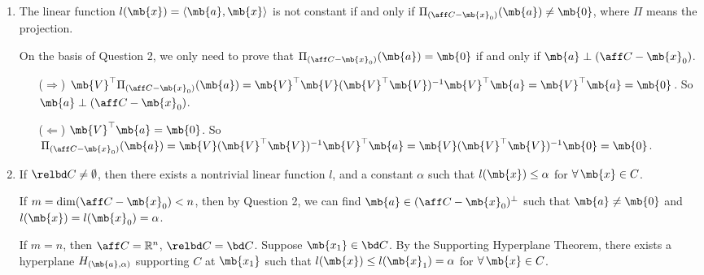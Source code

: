 \begin{exercise}
\begin{enumerate}
\begin{solution}
      \end{solution}
    \item
      The linear function $l(\mb{x})=\langle \mb{a},\mb{x}\rangle$ is not constant if and only if $\Pi_{(\aff C-\mb{x}_0)}(\mb{a})\neq \mb{0}$, where $\Pi$ means the projection.
      \begin{solution}
        On the basis of Question 2, we only need to prove that $\Pi_{(\aff C-\mb{x}_0)}(\mb{a}) = \mb{0}$ if and only if $\mb{a}\perp (\aff C-\mb{x}_0)$. 
        \begin{itemize}
          \item [($\Rightarrow$)]
            $\mb{V}^\top\Pi_{(\aff C-\mb{x}_0)}(\mb{a}) = \mb{V}^\top\mb{V}(\mb{V}^\top\mb{V})^{-1}\mb{V}^\top\mb{a} = \mb{V}^\top\mb{a} = \mb{0}$. So $\mb{a}\perp (\aff C-\mb{x}_0)$.
          \item [($\Leftarrow$)]
            $\mb{V}^\top\mb{a} = \mb{0}$. So $\Pi_{(\aff C-\mb{x}_0)}(\mb{a}) = \mb{V}(\mb{V}^\top\mb{V})^{-1}\mb{V}^\top\mb{a} = \mb{V}(\mb{V}^\top\mb{V})^{-1}\mb{0} = \mb{0}$.
            \qedhere
        \end{itemize}
      \end{solution}
    \item
      If $\relbd C\neq\emptyset$, then there exists a nontrivial linear function $l$, and a constant $\alpha$ such that $l(\mb{x})\le \alpha$ for $\forall\,\mb{x}\in C$.
      \begin{solution}
        If $m=\dim(\aff C-\mb{x}_0)<n$, then by Question 2, we can find $\mb{a} \in (\aff C-\mb{x}_0)^\perp$ such that $\mb{a}\neq \mb{0}$ and $l(\mb{x}) = l(\mb{x}_0) = \alpha$.
        
        If $m=n$, then $\aff C= \mathbb{R}^n$, $\relbd C = \bd C$. Suppose $\mb{x_1} \in \bd C$. By the Supporting Hyperplane Theorem, there exists a hyperplane $H_{(\mb{a},\alpha)}$ supporting $C$ at $\mb{x_1}$ such that $l(\mb{x})\le l(\mb{x}_1) = \alpha$ for $\forall\,\mb{x}\in C$.
        \qedhere
      \end{solution}
  \end{enumerate}
\end{exercise}
\newpage


